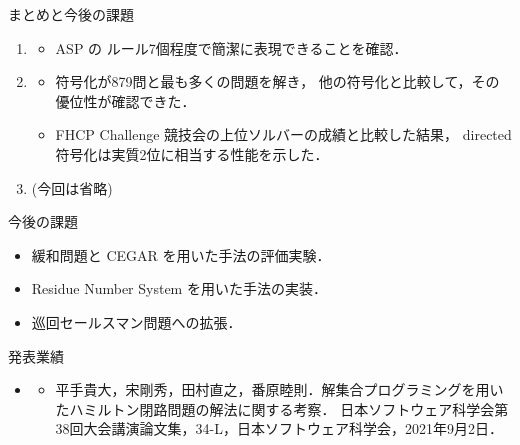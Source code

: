 \documentclass[dvipdfmx]{beamer}
\begin{document}
\begin{frame}{まとめと今後の課題}

\begin{enumerate}
\item {}
  \begin{itemize}
  \item ASP の \alert{ルール7個}程度で簡潔に表現できることを確認．
  \end{itemize}
\item {}
  \begin{itemize}
  \item {} 符号化が879問と最も多くの問題を解き，
    他の符号化と比較して，その優位性が確認できた．
  \item FHCP Challenge 競技会の上位ソルバーの成績と比較した結果，
    directed 符号化は\alert{実質2位}に相当する性能を示した．
  \end{itemize}
\item {} (今回は省略)
\end{enumerate}

\begin{block}{今後の課題}
  \begin{itemize}
  \item 緩和問題と CEGAR を用いた手法の評価実験．
  \item Residue Number System を用いた手法の実装．
  \item 巡回セールスマン問題への拡張．
  \end{itemize}
\end{block}
\end{frame}

\begin{frame}{発表業績}
\begin{itemize}
 \item {}
 \begin{itemize}
  \item 平手貴大，宋剛秀，田村直之，番原睦則．解集合プログラミングを用いたハミルトン閉路問題の解法に関する考察．
         日本ソフトウェア科学会第38回大会講演論文集，34-L，日本ソフトウェア科学会，2021年9月2日．
 \end{itemize}
\end{itemize}
\end{frame}
\end{document}
